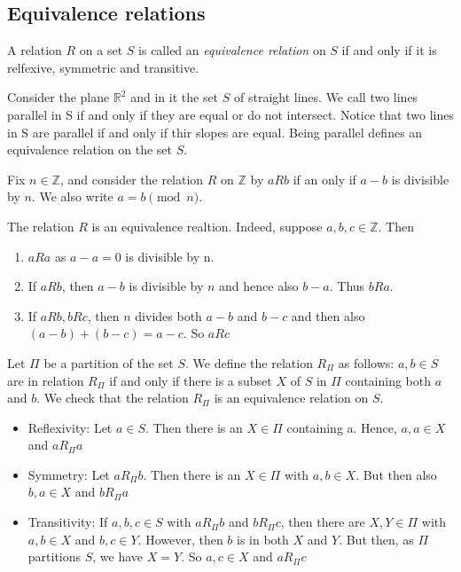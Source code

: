 \subsection{Equivalence relations}
\begin{definition}
    A relation $R$ on a set $S$ is called an \emph{equivalence relation} on $S$ if and only if it is relfexive, symmetric and transitive.
\end{definition}
\begin{example}
    Consider the plane $ \mathbb{R}^2 $ and in it the set $S$ of straight lines. We call two lines parallel in S if and only if they are equal or do not intersect.
    Notice that two lines in S are parallel if and only if thir slopes are equal. Being parallel defines an equivalence relation on the set $S$.
\end{example}
\begin{example}
    Fix $n \in \mathbb{Z}$, and consider the relation $R$ on $\mathbb{Z}$ by $aRb$ if an only if $a-b$ is divisible by $n$. We also write $ a = b \pmod{n} $. \par
    The relation $R$ is an equivalence realtion. Indeed, suppose $a,b,c \in \mathbb{Z}$. Then
    \begin{enumerate}
        \item $ aRa $ as $ a-a=0 $ is divisible by n.
        \item If $ aRb $, then $ a-b $ is divisible by $n$ and hence also $ b - a $. Thus $ bRa $.
        \item If $ aRb, bRc $, then $n$ divides both $ a-b $ and $ b-c $ and then also $ (a-b)+(b-c) = a-c $. So $ aRc $
    \end{enumerate}
\end{example}

\begin{example}
    Let $\Pi$ be a partition of the set $S$. We define the relation $R_\Pi$ as follows: $a,b \in S$ are in relation $R_\Pi$
    if and only if there is a subset $X$ of $S$ in $\Pi$ containing both $a$ and $b$. We check that the relation $R_\Pi$ is an equivalence relation on $S$.
    \begin{itemize}
        \item Reflexivity: Let $a \in S$. Then there is an $X \in \Pi$ containing a. Hence, $a,a \in X$ and $a R_\Pi a$
        \item Symmetry: Let $a R_\Pi b$. Then there is an $X \in \Pi$ with $a,b \in X$. But then also $b,a \in X$ and $b R_\Pi a$
        \item Transitivity: If $a, b, c \in S$ with $a R_\Pi b$ and $b R_\Pi c$, then there are $X,Y \in \Pi$ with $a,b \in X$ and $b,c \in Y$.
        However, then $b$ is in both $X$ and $Y$. But then, as $\Pi$ partitions $S$, we have $X = Y$. So $a,c \in X$ and $a R_\Pi c$
    \end{itemize}
\end{example}

